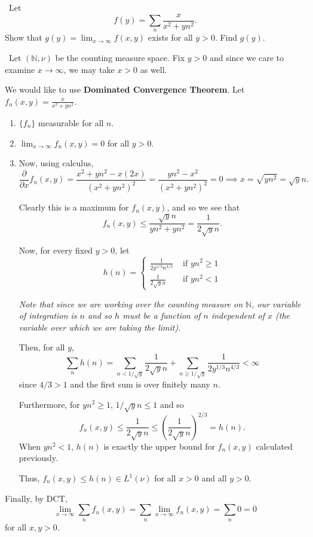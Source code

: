 \documentclass[12pt]{Qual}
\begin{document}
\begin{problem} $\,$
Let $$f(y)=\sum_n\frac{x}{x^2+yn^2}.$$ Show that $g(y)=\lim_{x\to\infty}f(x,y)$ exists for all $y>0$. Find $g(y)$.
\end{problem}


\begin{solution}$\,$
Let $(\mathbb{N},\nu)$ be the counting measure space. Fix $y>0$ and since we care to examine $x\to\infty$, we may take $x>0$ as well.

We would like to use \textbf{Dominated Convergence Theorem}. Let $f_n(x,y)=\frac{x}{x^2+yn^2}$.
\begin{enumerate}
    \item $\{f_n\}$ measurable for all $n.$
    \item $\lim_{x\to\infty}f_n(x,y)= 0$ for all $y>0$.
    \item Now, using calculus, $$\frac{\partial}{\partial x}f_n(x,y)=\frac{x^2+yn^2-x(2x)}{(x^2+yn^2)^2}=\frac{yn^2-x^2}{(x^2+yn^2)^2}=0\implies x=\sqrt{yn^2}=\sqrt{y}n.$$

    Clearly this is a maximum for $f_n(x,y)$, and so we see that $$f_n(x,y)\le \frac{\sqrt{y}n}{yn^2+yn^2}=\frac{1}{2\sqrt{y}n}.$$

    Now, for every fixed $y>0$, let \[
    h(n)=\begin{cases}
    \frac{1}{2y^{1/3}n^{4/3}} & \text{ if } yn^2\ge 1\\
    \frac{1}{2\sqrt{y}n} & \text{ if } yn^2<1
    \end{cases}
    \]

    \textit{Note that since we are working over the counting measure on $\mathbb{N}$, our variable of integration is $n$ and so $h$ must be a function of $n$ independent of $x$ (the variable over which we are taking the limit).}

    Then, for all $y$, $$\sum_n h(n)=\sum_{n<1/\sqrt{y}}\frac{1}{2\sqrt{y}n}+\sum_{n\ge 1/\sqrt{y}}\frac{1}{2y^{1/3}n^{4/3}}<\infty$$ since $4/3>1$ and the first sum is over finitely many $n$.

    Furthermore, for $yn^2\ge 1$, $1/\sqrt{y}n\le 1$ and so $$f_n(x,y)\le \frac{1}{2\sqrt{y}n}\le \left(\frac{1}{2\sqrt{y}n}\right)^{2/3}=h(n).$$ When $yn^2<1$, $h(n)$ is exactly the upper bound for $f_n(x,y)$ calculated previously.

    Thus, $f_n(x,y)\le h(n)\in L^1(\nu)$ for all $x>0$ and all $y>0$.
\end{enumerate}
Finally, by DCT, $$\lim_{x\to\infty} \sum_nf_n(x,y)=\sum_n\lim_{x\to\infty} f_n(x,y)=\sum_n0=0$$ for all $x,y>0$.
\end{solution}
\newpage
\end{document}
